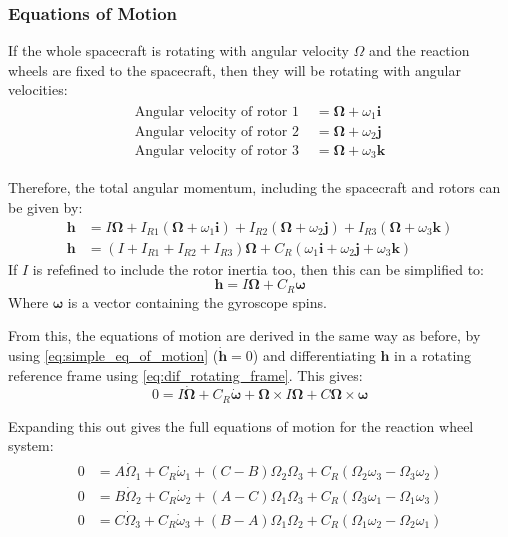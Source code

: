 \documentclass[12]{article}
\begin{document}
\begin{multicols*}{2}
\subsubsection{Equations of Motion}

If the whole spacecraft is rotating with angular velocity $\Omega$ and the reaction wheels are fixed to the spacecraft, then they will be rotating with angular velocities:
\begin{align} \label{reaction_wheel_velocities}
\begin{split}
\textrm{Angular velocity of rotor 1 } &= \bm{\Omega} + \omega_1\bm{i} \\
\textrm{Angular velocity of rotor 2 } &= \bm{\Omega} + \omega_2\bm{j} \\
\textrm{Angular velocity of rotor 3 } &= \bm{\Omega} + \omega_3\bm{k}
\end{split}
\end{align}

Therefore, the total angular momentum, including the spacecraft and rotors can be given by:
\begin{align*}
\bm{h} &= I\bm{\Omega} +
I_{R1}(\bm{\Omega} + \omega_1\bm{i}) +
I_{R2}(\bm{\Omega} + \omega_2\bm{j}) +
I_{R3}(\bm{\Omega} + \omega_3\bm{k}) \\
\bm{h} &= (I + I_{R1} + I_{R2} + I_{R3})\bm{\Omega} +
C_R(\omega_1\bm{i} + \omega_2\bm{j} + \omega_3\bm{k})
\end{align*}
If $I$ is refefined to include the rotor inertia too, then this can be simplified to:
\begin{equation} \label{eq:reaction_wheel_h}
\bm{h} = I\bm{\Omega} + C_R\bm{\omega}
\end{equation}
Where $\bm{\omega}$ is a vector containing the gyroscope spins.

From this, the equations of motion are derived in the same way as before, by using \cref{eq:simple_eq_of_motion} ($\dot{\bm{h}} = 0$) and differentiating $\bm{h}$ in a rotating reference frame using \cref{eq:dif_rotating_frame}. This gives:
\begin{equation} \label{eq:reaction_eq_of_motion_vector}
0 = I\dot{\bm{\Omega}} + C_R\bm{\dot{\omega}} + \bm{\Omega}\times I\bm{\Omega} + C\bm{\Omega}\times \bm{\omega}
\end{equation}

Expanding this out gives the full equations of motion for the reaction wheel system:
\begin{align} \label{eq:reaction_eq_of_motion}
\begin{split}
0 &= A\dot{\Omega}_1 + C_R\dot{\omega}_1 + (C - B)\Omega_2\Omega_3
+ C_R(\Omega_2\omega_3 - \Omega_3\omega_2) \\
0 &= B\dot{\Omega}_2 + C_R\dot{\omega}_2 + (A - C)\Omega_1\Omega_3
+ C_R(\Omega_3\omega_1 - \Omega_1\omega_3) \\
0 &= C\dot{\Omega}_3 + C_R\dot{\omega}_3 + (B - A)\Omega_1\Omega_2
+ C_R(\Omega_1\omega_2 - \Omega_2\omega_1)
\end{split}
\end{align}



\end{multicols*}
\end{document}
